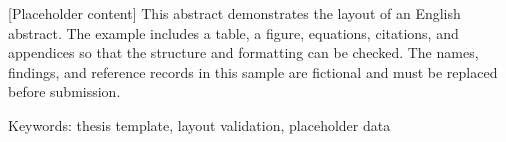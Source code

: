 [Placeholder content] This abstract demonstrates the layout of an English
abstract. The example includes a table, a figure, equations, citations, and
appendices so that the structure and formatting can be checked.
The names, findings, and reference records in this sample are fictional
and must be replaced before submission.

Keywords: thesis template, layout validation, placeholder data
